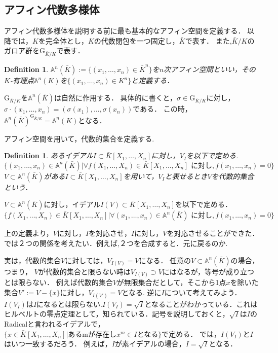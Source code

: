 \documentclass{ujarticle}
\newtheorem{dfn}[thm]{Definition}
\begin{document}
\subsection{アフィン代数多様体}
\label{subs:アフィン代数多様体}
アフィン代数多様体を説明する前に最も基本的なアフィン空間を定義する．
以降では，$K$を完全体とし，$K$の代数閉包を一つ固定し，$\bar{K}$で表す．
また,$\bar{K}/K$のガロア群を$\mathrm{G}_{ \bar{K}/K}$で表す．
\begin{dfn}
 $\mathbb{A}^n(\bar{K}):=\{ (x_1,\dots,x_n) \in \bar{K}^n \} $を$n$次アフィン空間といい，その$K$-有理点$\mathbb{A}^n(K)$を$\{ (x_1,\dots,x_n) \in K^n \}$と定義する．
\end{dfn}
$\mathrm{G}_{\bar{K}/K}$を$\mathbb{A}^n(\bar{K})$は自然に作用する．
具体的に書くと，$\sigma \in \mathrm{G}_{\bar{K}/K}$に対し， $ \sigma\cdot (x_1 , \dots , x_n) =(\sigma(x_1),\dots , \sigma(x_n))$である．
この時，$\mathbb{A}^n(\bar{K})^{\mathrm{G}_{\bar{K}/K}}= \mathbb{A}^n(K)$となる．

アフィン空間を用いて，代数的集合を定義する.
\begin{dfn}
 あるイデアル$I \subset \bar{K}[X_1,\dots,X_n]$に対し，$V_I$を以下で定める.
\begin{equation*}
   \{ (x_1,\dots,x_n)  \in \mathbb{A}^n(\bar{K})|  \forall f(X_1,\dots,X_n) \in \bar{K}[X_1,\dots,X_n] \mbox{ に対し},f(x_1,\dots,x_n)=0 \}
\end{equation*}
$V \subset  \mathbb{A}^n(\bar{K}) $がある$I \subset \bar{K}[X_1,\dots,X_n]$を用いて，$V_I$と表せるとき$V$を代数的集合という．
\end{dfn}

$V \subset \mathbb{A}^n(\bar{K})$に対し，イデアル$I(V) \subset  \bar{K}[X_1,\dots,X_n]$を以下で定める．
\begin{equation*}
   \{ f(X_1,\dots,X_n)  \in \bar{K}[X_1,\dots,X_n]|  \forall (x_1,\dots,x_n) \in \mathbb{A}^n(\bar{K}) \mbox{ に対し},f(x_1,\dots,x_n)=0 \}
\end{equation*}

上の定義より，$V$に対し，$I$を対応させ，$I$に対し，$V$を対応させることができた．
では２つの関係を考えたい．例えば,２つを合成すると．元に戻るのか.

実は，代数的集合$V$に対しては，$V_{I(V)} =V$になる．
任意の$V \subset \mathbb{A}^n(\bar{K})$の場合，つまり，
$V$が代数的集合と限らない時は$V_{I(V)} \supset V$にはなるが，等号が成り立つとは限らない．
例えば代数的集合$V$が無限集合だとして，そこから1点$x$を除いた集合$V':=V-\{x\}$に対し，$V_{I(V')}=V$となる.
逆に$I$について考えてみよう．$I(V_I)$は$I$になるとは限らない.$I(V_I)=  \sqrt{I}$となることがわかっている．これはヒルベルトの零点定理として，知られている．記号を説明しておくと，$\sqrt{I}$は$I$のRadicalと言われるイデアルで，$\{ x \in \bar{K}[X_1,\dots,X_n] | \mbox{あるmが存在し} x^m \in I \mbox{となる}\}　$で定める．
では，$I(V_I)$と$I$はいつ一致するだろう． 例えば，$I$が素イデアルの場合，$I = \sqrt{I}$となる．
\end{document}

